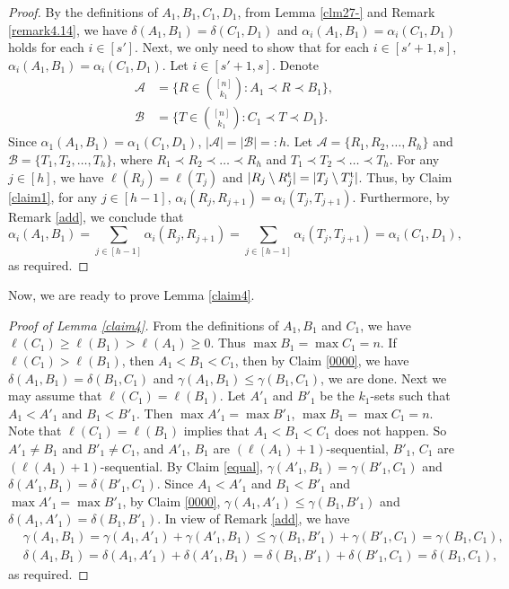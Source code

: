 \documentclass[a4paper,11pt]{article}
\begin{document}
\begin{proof}
 By the definitions of $A_1, B_1, C_1, D_1$, from Lemma \ref{clm27-} and Remark \ref{remark4.14}, we have
 $\delta(A_1, B_1)=\delta(C_1, D_1)$ and $\alpha_i(A_1, B_1)=\alpha_i(C_1, D_1)$ holds for each $i\in [s']$.  Next, we only need to show that for each $i\in [s'+1, s]$, $\alpha_i(A_1, B_1)=\alpha_i(C_1, D_1)$. Let $i\in [s'+1, s]$.
Denote
\begin{align*}
\mathcal{A}&=\Big\{R\in {[n]\choose k_1}: A_1\prec R\prec B_1\Big\},\\
\mathcal{B}&=\Big\{T\in {[n]\choose k_1}: C_1\prec T\prec D_1\Big\}.
\end{align*}
Since $\alpha_1(A_1, B_1)=\alpha_1(C_1, D_1)$, $|\mathcal{A}|=|\mathcal{B}|=:h$.
Let $\mathcal{A}=\{R_1, R_2, \dots, R_h\}$ and $\mathcal{B}=\{T_1, T_2, \dots, T_h\}$, where $R_1 \prec R_2 \prec \dots \prec R_h$ and $T_1 \prec T_2 \prec \dots \prec T_h$.
For any $j\in [h]$, we have $\ell(R_j)=\ell(T_j)$ and $|R_j\setminus R_j^{\rm t}|=|T_j\setminus T_j^{\rm t}|$. Thus, by Claim \ref{claim1}, for any $j\in [h-1]$, $\alpha_i(R_j, R_{j+1})=\alpha_i(T_j, T_{j+1})$. Furthermore, by Remark \ref{add}, we conclude that
$$\alpha_i(A_1, B_1)=\sum_{j\in [h-1]}\alpha_i(R_j, R_{j+1})=\sum_{j\in [h-1]}\alpha_i(T_j, T_{j+1})=\alpha_i(C_1, D_1),$$
as required.
\end{proof}



Now, we are ready to prove Lemma \ref{claim4}.
\begin{proof}[Proof of Lemma \ref{claim4}]
From the definitions of $A_1, B_1$ and $C_1$, we have $\ell(C_1)\geq \ell(B_1)>\ell(A_1)\geq 0$. Thus $\max B_1=\max C_1=n$.
If $\ell(C_1)> \ell(B_1)$, then $A_1<B_1<C_1$, then by Claim \ref{0000}, we have
$\delta(A_1, B_1)=\delta(B_1, C_1)$ and $\gamma(A_1, B_1)\leq \gamma(B_1, C_1)$, we are done.
Next we may assume that $\ell(C_1)= \ell(B_1)$.  Let $A'_1$ and $B'_1$ be the $k_1$-sets such that $A_1<A'_1$ and $B_1<B'_1$.
Then $\max A'_1=\max B'_1$, $\max B_1=\max C_1=n$.
Note that $\ell(C_1)= \ell(B_1)$ implies that $A_1<B_1<C_1$ does not happen. So $A'_1\ne B_1$ and $B'_1\ne C_1$,
 and $A'_1$, $B_1$ are $(\ell(A_1)+1)$-sequential, $B'_1$, $C_1$ are $(\ell(A_1)+1)$-sequential.
By Claim \ref{equal},
$\gamma(A'_1, B_1)=\gamma(B'_1, C_1)$ and $\delta(A'_1, B_1)=\delta(B'_1, C_1)$. Since $A_1<A'_1$ and $B_1<B'_1$ and $\max A'_1=\max B'_1$, by Claim \ref{0000},
$\gamma(A_1, A'_1)\leq \gamma(B_1, B'_1)$ and $\delta(A_1, A'_1)=\delta(B_1, B'_1)$. In view of Remark \ref{add}, we have
\begin{align*}
&\gamma(A_1, B_1)=\gamma(A_1, A'_1)+\gamma(A'_1, B_1)\leq \gamma(B_1, B'_1)+\gamma(B'_1, C_1)=\gamma(B_1, C_1),\\
&\delta(A_1, B_1)=\delta(A_1, A'_1)+\delta(A'_1, B_1)= \delta(B_1, B'_1)+\delta(B'_1, C_1)=\delta(B_1, C_1),
\end{align*}
as required.
\end{proof}
\end{document}

